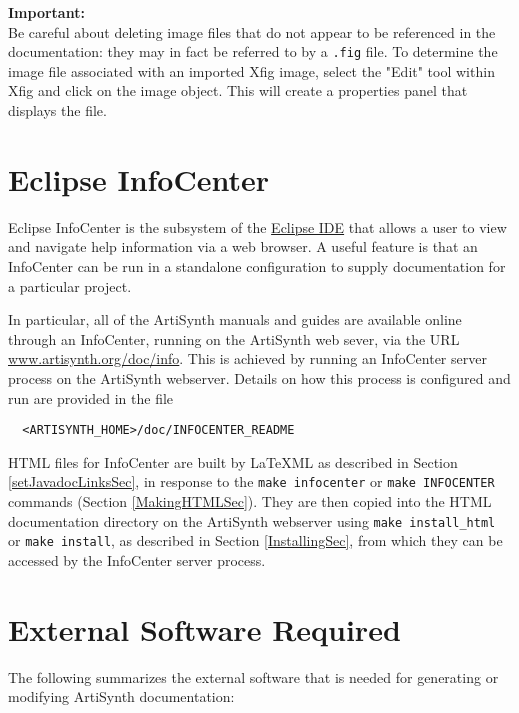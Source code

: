 \documentclass{article}
\begin{document}
\begin{sideblock}
{\bf Important:}\\ Be careful about deleting image files that do not
appear to be referenced in the documentation: they may in fact be
referred to by a {\tt .fig} file.  To determine the image file
associated with an imported Xfig image, select the "Edit" tool within
Xfig and click on the image object.  This will create a properties
panel that displays the file.
\end{sideblock}

\section{Eclipse InfoCenter}
\label{InfoCenterSec}

Eclipse InfoCenter is the subsystem of the
\href{https://www.eclipse.org}{Eclipse IDE} that allows a user to view
and navigate help information via a web browser. A useful feature is
that an InfoCenter can be run in a standalone configuration to supply
documentation for a particular project. 

In particular, all of the ArtiSynth manuals and guides are available
online through an InfoCenter, running on the ArtiSynth web sever, via
the URL
\href{https://www.artisynth.org/doc/info}{www.artisynth.org/doc/info}.
This is achieved by running an InfoCenter server process on the
ArtiSynth webserver. Details on how this process is configured and run
are provided in the file
\begin{verbatim}
  <ARTISYNTH_HOME>/doc/INFOCENTER_README
\end{verbatim}

HTML files for InfoCenter are built by LaTeXML as described in
Section \ref{setJavadocLinksSec}, in response to the {\tt make
infocenter} or {\tt make INFOCENTER} commands (Section
\ref{MakingHTMLSec}).  They are then copied into the HTML
documentation directory on the ArtiSynth webserver using {\tt make
install\_html} or {\tt make install}, as described in Section
\ref{InstallingSec}, from which they can be accessed by the InfoCenter
server process.

\section{External Software Required}
\label{ExternalSoftwareSec}

The following summarizes the external software that
is needed for generating or modifying ArtiSynth
documentation:
\end{document}
